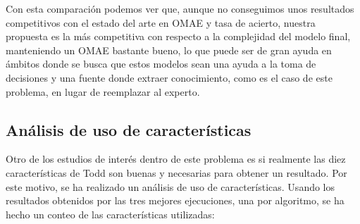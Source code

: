 Con esta comparación podemos ver que, aunque no conseguimos unos resultados competitivos con el estado del arte en OMAE y tasa de acierto, nuestra propuesta es la más competitiva con respecto a la complejidad del modelo final, manteniendo un OMAE bastante bueno, lo que puede ser de gran ayuda en ámbitos donde se busca que estos modelos sean una ayuda a la toma de decisiones y una fuente donde extraer conocimiento, como es el caso de este problema, en lugar de reemplazar al experto.

\newpage

\subsection{Análisis de uso de características}

Otro de los estudios de interés dentro de este problema es si realmente las diez características de Todd son buenas y necesarias para obtener un resultado. Por este motivo, se ha realizado un análisis de uso de características. Usando los resultados obtenidos por las tres mejores ejecuciones, una por algoritmo, se ha hecho un conteo de las características utilizadas:

